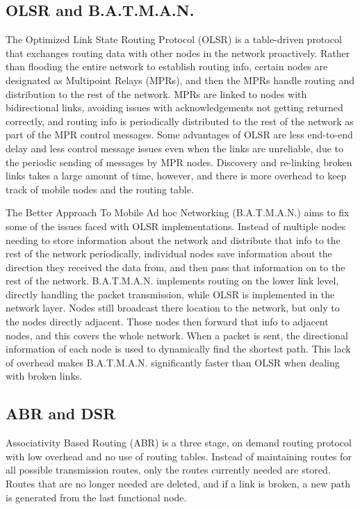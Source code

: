 \documentclass[conference]{IEEEtran}
\begin{document}
\subsection{OLSR and B.A.T.M.A.N.}
The Optimized Link State Routing Protocol (OLSR) is a table-driven protocol that exchanges routing data with other nodes in the network proactively.  Rather than flooding the
entire network to establish routing info, certain nodes are designated as Multipoint Relays (MPRs), and then the MPRs handle routing and distribution to the rest of the network.
MPRs are linked to nodes with bidirectional links, avoiding issues with acknowledgements not getting returned correctly, and routing info is periodically distributed to the rest 
of the network as part of the MPR control messages\cite{clausen_jacquet_2003}.  Some advantages of OLSR are less end-to-end delay and less control message issues even when the links are unreliable, due to the 
periodic sending of messages by MPR nodes. Discovery and re-linking broken links takes a large amount of time, however, and there is more overhead to keep track of mobile nodes and the 
routing table\cite{researchgate}.

The Better Approach To Mobile Ad hoc Networking (B.A.T.M.A.N.) aims to fix some of the issues faced with OLSR implementations.  Instead of multiple nodes needing to store information about 
the network and distribute that info to the rest of the network periodically, individual nodes save information about the direction they received the data from, and then pass that information on
to the rest of the network\cite{why-starting-batman}. B.A.T.M.A.N. implements routing on the lower link level, directly handling the packet transmission, while OLSR is implemented in the network layer.  Nodes still broadcast there location to 
the network, but only to the nodes directly adjacent. Those nodes then forward that info to adjacent nodes, and this covers the whole network.  When a packet is sent, the directional information of each node is used to 
dynamically find the shortest path. This lack of overhead makes B.A.T.M.A.N. significantly faster than OLSR when dealing with broken links.  
\subsection{ABR and DSR}
Associativity Based Routing (ABR) is a three stage, on demand routing protocol with low overhead and no use of routing tables.  Instead of maintaining routes for all possible transmission routes, only the routes 
currently needed are stored.  Routes that are no longer needed are deleted, and if a link is broken, a new path is generated from the last functional node\cite{toh_1997}. 
\end{document}
